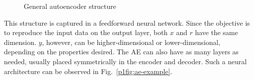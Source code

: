 \begin{figure}[ht!]
\begin{center}
\end{center}
  \caption{General autoencoder structure}
  \label{p1fig:structure}
\end{figure}

This structure is captured in a feedforward neural network. Since the objective is to reproduce the input data on the output layer, both $x$ and $r$ have the same dimension. $y$, however, can be higher-dimensional or lower-dimensional, depending on the properties desired. The AE can also have as many layers as needed, usually placed symmetrically in the encoder and decoder. Such a neural architecture can be observed in Fig.~\ref{p1fig:ae-example}.

